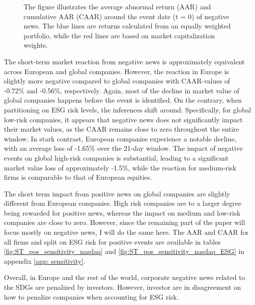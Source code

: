 \begin{figure} [H]
\begin{minipage}[b]{0.49\textwidth}
    \label{fig:ST_pos_sensitivity_nasdaq}
     \end{minipage}
        \caption*{\footnotesize The figure illustrates the average abnormal return (AAR) and cumulative AAR (CAAR) around the event date (t = 0) of negative news. The blue lines are returns calculated from an equally weighted portfolio, while the red lines are based on market capitalization weights.}
        
        \label{fig:three graphs}
\end{figure}

The short-term market reaction from negative news is approximately equivalent across European and global companies. However, the reaction in Europe is slightly more negative compared to global companies with CAAR-values of -0.72\% and -0.56\%, respectively. Again, most of the decline in market value of global companies happens before the event is identified. On the contrary, when partitioning on ESG risk levels, the inferences shift around. Specifically, for global low-risk companies, it appears that negative news does not significantly impact their market values, as the CAAR remains close to zero throughout the entire window. In stark contrast, European companies experience a notable decline, with an average loss of -1.65\% over the 21-day window. 
The impact of negative events on global high-risk companies is substantial, leading to a significant market value loss of approximately -1.5\%, while the reaction for medium-risk firms is comparable to that of European equities.

The short term impact from positive news on global companies are slightly different from European companies. High risk companies are to a larger degree being rewarded for positive news, whereas the impact on medium and low-risk companies are close to zero. However, since the remaining part of the paper will focus mostly on negative news, I will do the same here. The AAR and CAAR for all firms and split on ESG risk for positive events are available in tables \ref{fig:ST_pos_sensitivity_nasdaq} and \ref{fig:ST_pos_sensitivity_nasdaq_ESG} in appendix \ref{app: sensitivity}.

Overall, in Europe and the rest of the world, corporate negative news related to the SDGs are penalized by investors. However, investor are in disagreement on how to penalize companies when accounting for ESG risk.  





